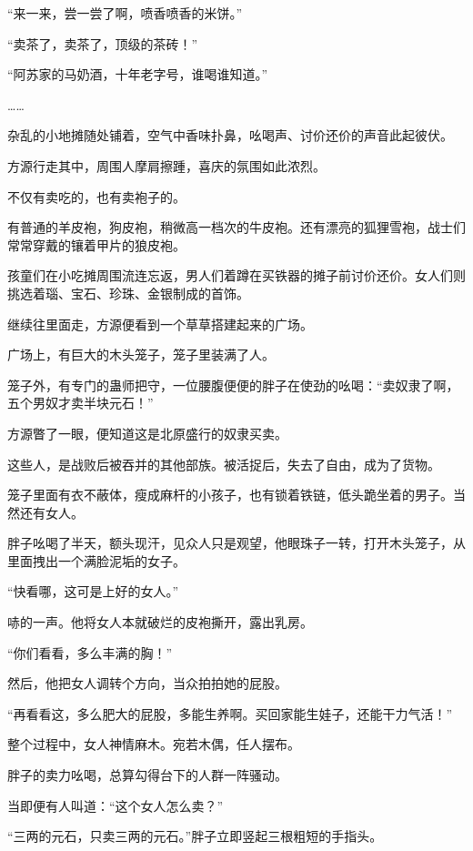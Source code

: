 
\begin{this_body}

“来一来，尝一尝了啊，喷香喷香的米饼。”

“卖茶了，卖茶了，顶级的茶砖！”

“阿苏家的马奶酒，十年老字号，谁喝谁知道。”

……

杂乱的小地摊随处铺着，空气中香味扑鼻，吆喝声、讨价还价的声音此起彼伏。

方源行走其中，周围人摩肩擦踵，喜庆的氛围如此浓烈。

不仅有卖吃的，也有卖袍子的。

有普通的羊皮袍，狗皮袍，稍微高一档次的牛皮袍。还有漂亮的狐狸雪袍，战士们常常穿戴的镶着甲片的狼皮袍。

孩童们在小吃摊周围流连忘返，男人们着蹲在买铁器的摊子前讨价还价。女人们则挑选着瑙、宝石、珍珠、金银制成的首饰。

继续往里面走，方源便看到一个草草搭建起来的广场。

广场上，有巨大的木头笼子，笼子里装满了人。

笼子外，有专门的蛊师把守，一位腰腹便便的胖子在使劲的吆喝：“卖奴隶了啊，五个男奴才卖半块元石！”

方源瞥了一眼，便知道这是北原盛行的奴隶买卖。

这些人，是战败后被吞并的其他部族。被活捉后，失去了自由，成为了货物。

笼子里面有衣不蔽体，瘦成麻杆的小孩子，也有锁着铁链，低头跪坐着的男子。当然还有女人。

胖子吆喝了半天，额头现汗，见众人只是观望，他眼珠子一转，打开木头笼子，从里面拽出一个满脸泥垢的女子。

“快看哪，这可是上好的女人。”

哧的一声。他将女人本就破烂的皮袍撕开，露出乳房。

“你们看看，多么丰满的胸！”

然后，他把女人调转个方向，当众拍拍她的屁股。

“再看看这，多么肥大的屁股，多能生养啊。买回家能生娃子，还能干力气活！”

整个过程中，女人神情麻木。宛若木偶，任人摆布。

胖子的卖力吆喝，总算勾得台下的人群一阵骚动。

当即便有人叫道：“这个女人怎么卖？”

“三两的元石，只卖三两的元石。”胖子立即竖起三根粗短的手指头。


\end{this_body}
